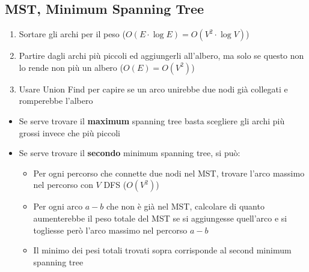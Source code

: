 \subsection{MST, Minimum Spanning Tree}
\begin{enumerate}
    \item Sortare gli archi per il peso ($O(E\cdot \log E)=O(V^2\cdot \log V)$)
    \item Partire dagli archi più piccoli ed aggiungerli all'albero, ma solo se questo non lo rende non più un albero ($O(E)=O(V^2)$)
    \item Usare Union Find per capire se un arco unirebbe due nodi già collegati e romperebbe l'albero
\end{enumerate}
\begin{itemize}
    \item Se serve trovare il \textbf{maximum} spanning tree basta scegliere gli archi più grossi invece che più piccoli
    \item Se serve trovare il \textbf{secondo} minimum spanning tree, si può:
    \begin{itemize}
        \item Per ogni percorso che connette due nodi nel MST, trovare l'arco massimo nel percorso con $V$ DFS ($O(V^2)$)
        \item Per ogni arco $a-b$ che non è già nel MST, calcolare di quanto aumenterebbe il peso totale del MST se si aggiungesse quell'arco e si togliesse però l'arco massimo nel percorso $a-b$
        \item Il minimo dei pesi totali trovati sopra corrisponde al second minimum spanning tree
    \end{itemize}
\end{itemize}
